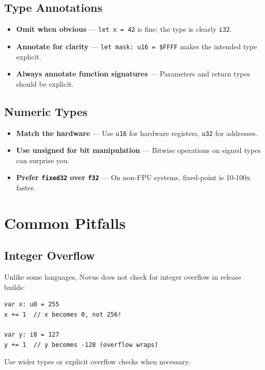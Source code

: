 \subsection{Type Annotations}

\begin{itemize}
    \item \textbf{Omit when obvious} --- \texttt{let x = 42} is fine; the type is clearly \texttt{i32}.
    \item \textbf{Annotate for clarity} --- \texttt{let mask: u16 = \$FFFF} makes the intended type explicit.
    \item \textbf{Always annotate function signatures} --- Parameters and return types should be explicit.
\end{itemize}

\subsection{Numeric Types}

\begin{itemize}
    \item \textbf{Match the hardware} --- Use \texttt{u16} for hardware registers, \texttt{u32} for addresses.
    \item \textbf{Use unsigned for bit manipulation} --- Bitwise operations on signed types can surprise you.
    \item \textbf{Prefer \texttt{fixed32} over \texttt{f32}} --- On non-FPU systems, fixed-point is 10-100x faster.
\end{itemize}

\section{Common Pitfalls}

\subsection{Integer Overflow}

Unlike some languages, Novus does not check for integer overflow in release builds:

\begin{lstlisting}
var x: u8 = 255
x += 1  // x becomes 0, not 256!

var y: i8 = 127
y += 1  // y becomes -128 (overflow wraps)
\end{lstlisting}

Use wider types or explicit overflow checks when necessary.

